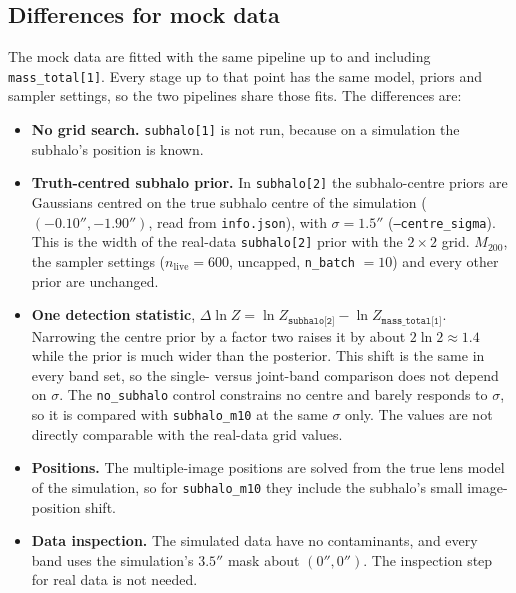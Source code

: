 \subsection{\label{sc:pipeline_mock}Differences for mock data}

The mock data are fitted with the same pipeline up to and including \texttt{mass\_total[1]}. Every
stage up to that point has the same model, priors and sampler settings, so the two pipelines share
those fits. The differences are:
\begin{itemize}
    \item \textbf{No grid search.} \texttt{subhalo[1]} is not run, because on a simulation the
    subhalo's position is known.
    \item \textbf{Truth-centred subhalo prior.} In \texttt{subhalo[2]} the subhalo-centre priors are
    Gaussians centred on the true subhalo centre of the simulation ($(-0.10'', -1.90'')$, read from
    \texttt{info.json}), with $\sigma = 1.5''$ (\texttt{--centre\_sigma}). This is the width of the
    real-data \texttt{subhalo[2]} prior with the $2 \times 2$ grid. $M_{200}$, the sampler settings
    ($n_\mathrm{live} = 600$, uncapped, \texttt{n\_batch} $= 10$) and every other prior are unchanged.
    \item \textbf{One detection statistic},
    $\Delta \ln Z = \ln Z_{\texttt{subhalo[2]}} - \ln Z_{\texttt{mass\_total[1]}}$. Narrowing the centre
    prior by a factor two raises it by about $2 \ln 2 \approx 1.4$ while the prior is much wider
    than the posterior. This shift is the same in every band set, so the single- versus joint-band
    comparison does not depend on $\sigma$. The \texttt{no\_subhalo} control constrains no centre and
    barely responds to $\sigma$, so it is compared with \texttt{subhalo\_m10} at the same $\sigma$
    only. The values are not directly comparable with the real-data grid values.
    \item \textbf{Positions.} The multiple-image positions are solved from the true lens model of the
    simulation, so for \texttt{subhalo\_m10} they include the subhalo's small image-position shift.
    \item \textbf{Data inspection.} The simulated data have no contaminants, and every band uses the
    simulation's $3.5''$ mask about $(0'', 0'')$. The inspection step for real data is not needed.
\end{itemize}
